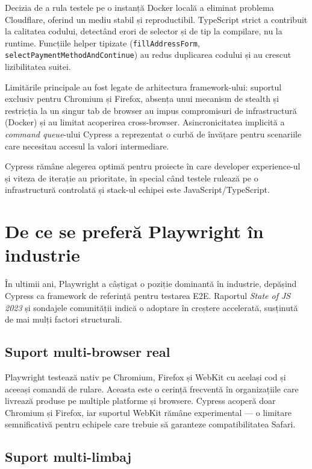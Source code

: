 Decizia de a rula testele pe o instanță Docker locală a eliminat problema Cloudflare,
oferind un mediu stabil și reproductibil. TypeScript strict a contribuit la calitatea
codului, detectând erori de selector și de tip la compilare, nu la runtime. Funcțiile
helper tipizate (\texttt{fillAddressForm}, \texttt{selectPaymentMethodAndContinue})
au redus duplicarea codului și au crescut lizibilitatea suitei.

Limitările principale au fost legate de arhitectura framework-ului: suportul exclusiv
pentru Chromium și Firefox, absența unui mecanism de stealth și restricția la un
singur tab de browser au impus compromisuri de infrastructură (Docker) și au limitat
acoperirea cross-browser. Asincronicitatea implicită a \textit{command queue}-ului
Cypress a reprezentat o curbă de învățare pentru scenariile care necesitau accesul
la valori intermediare.

Cypress rămâne alegerea optimă pentru proiecte în care developer experience-ul și
viteza de iterație au prioritate, în special când testele rulează pe o infrastructură
controlată și stack-ul echipei este JavaScript/TypeScript.

\section{De ce se preferă Playwright în industrie}

În ultimii ani, Playwright a câștigat o poziție dominantă în industrie, depășind
Cypress ca framework de referință pentru testarea E2E. Raportul \textit{State of JS
2023} și sondajele comunității indică o adoptare în creștere accelerată, susținută
de mai mulți factori structurali.

\subsection*{Suport multi-browser real}

Playwright testează nativ pe Chromium, Firefox și WebKit cu același cod și aceeași
comandă de rulare. Aceasta este o cerință frecventă în organizațiile care livrează
produse pe multiple platforme și browsere. Cypress acoperă doar Chromium și Firefox,
iar suportul WebKit rămâne experimental --- o limitare semnificativă pentru echipele
care trebuie să garanteze compatibilitatea Safari.

\subsection*{Suport multi-limbaj}

